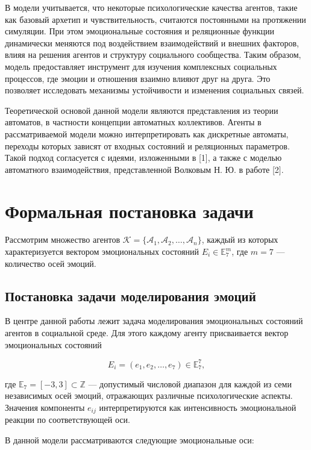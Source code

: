 \documentclass[12pt]{article}
\begin{document}
В модели учитывается, что некоторые психологические качества агентов, такие как базовый архетип и чувствительность, считаются постоянными на протяжении симуляции.
При этом эмоциональные состояния и реляционные функции динамически меняются под воздействием взаимодействий и внешних факторов, влияя на решения агентов и структуру социального сообщества.
Таким образом, модель предоставляет инструмент для изучения комплексных социальных процессов, где эмоции и отношения взаимно влияют друг на друга.
Это позволяет исследовать механизмы устойчивости и изменения социальных связей.

Теоретической основой данной модели являются представления из теории автоматов, в частности концепции автоматных коллективов. Агенты в рассматриваемой модели можно интерпретировать как дискретные автоматы, переходы которых зависят от входных состояний и реляционных параметров. Такой подход согласуется с идеями, изложенными в [1], а также с моделью автоматного взаимодействия, представленной Волковым Н. Ю. в работе [2].


\section{Формальная постановка задачи}


Рассмотрим множество агентов \( \mathcal{K} = \{\mathcal{A}_1, \mathcal{A}_2, \ldots, \mathcal{A}_n \} \), каждый из которых характеризуется вектором эмоциональных состояний \(E_i  \in \mathbb{E}_7^m\), где \(m=7\) — количество осей эмоций.

\subsection*{Постановка задачи моделирования эмоций}

В центре данной работы лежит задача моделирования эмоциональных состояний агентов в социальной среде. Для этого каждому агенту присваивается вектор эмоциональных состояний

\[
E_i = (e_{1}, e_{2}, \ldots, e_{7}) \in \mathbb{E}_7^7,
\]

где \( \mathbb{E}_7 = [-3, 3] \subset \mathbb{Z} \) — допустимый числовой диапазон для каждой из семи независимых осей эмоций, отражающих различные психологические аспекты. Значения компоненты \( e_{ij} \) интерпретируются как интенсивность эмоциональной реакции по соответствующей оси.

В данной модели рассматриваются следующие эмоциональные оси:
\end{document}
